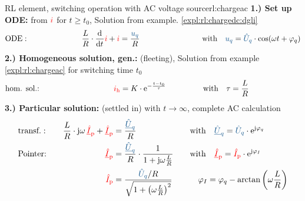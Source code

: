 {\begin{expl}{RL element, switching operation with AC voltage source}{rl:chargeac}
        \textbf{1.) Set up ODE:} from ${\color{red}i}$ for $t \geq t_0$, Solution from example. \ref{expl:rl:chargedc:dgli}
        \begin{align*}
            &\text{ODE}:&&&
                \frac{L}{R} \cdot \dt \eci{i}  + \eci{i}   &= \frac{\ecv{u_q}}{R}&&&
                &\text{with}\quad \ecv{u_q} = \ecv{\hat{U}_q} \cdot \cos(\omega t + \varphi_q)
            \\[-15pt]&\hphantom{R1oooooooooo}&&&\hphantom{L3ooooooooooo}&\hphantom{R3ooooooooooooooo}&&&&\hphantom{R5ooooooooooooooooooooooo}\nonumber%
        \end{align*}%
        \textbf{2.) Homogeneous solution, gen.:} (fleeting), Solution from example \ref{expl:rl:chargeac} for switching time $t_0$
        \begin{align*}
            &\text{hom. sol.:} &&&
                \eci{i_{\mathrm{h}}}&= K \cdot \mathrm{e}^{-\frac{t-t_0}{\tau}} &&&
                &\text{with}\quad \tau = \frac{L}{R}
            \\[-15pt]&\hphantom{R1oooooooooo}&&&\hphantom{L3ooooooooooo}&\hphantom{R3ooooooooooooooo}&&&&\hphantom{R5ooooooooooooooooooooooo}\nonumber%
        \end{align*}%
        \textbf{3.) Particular solution:} (settled in) with $t \to \infty$, complete AC calculation%
        \begin{align*}%
                &\text{transf.}:&&&
                \frac{L}{R} \cdot \mathrm{j}\omega\, \eci{\underline{\hat{I}}_{\mathrm p}} + \eci{\underline{\hat{I}}_{\mathrm p}} &= \frac{\ecv{\underline{\hat{U}}_q}}{R} &&&
                    &\text{with}\quad \ecv{\underline{\hat{U}}_q}=\ecv{\hat{U}_q} \cdot \mathrm{e}^{\mathrm{j}\varphi_q}\\
                &\text{Pointer:}&&&
                    \eci{\underline{\hat{I}}_{\mathrm p}} &= \frac{\ecv{\underline{\hat{U}}_q}}{R} \cdot \frac{1}{1 + \mathrm{j} \omega \frac{L}{R}} &&&
                    &\text{with}\quad \eci{\underline{\hat{I}}_{\mathrm p}} = \eci{\hat{I}_{\mathrm p}}\cdot\mathrm{e}^{\mathrm{j}\varphi_I}\\
                &&&&
                    \eci{\hat{I}_{\mathrm p}} &=  \frac{\ecv{\hat{U}_q}/R}{\sqrt{1 + \left(\omega \frac{L}{R}\right)^2}} &&&
                    &\quad \varphi_I = \varphi_q - \arctan\left(\omega \frac{L}{R}\right) \\

\end{align*}
\end{expl}}

